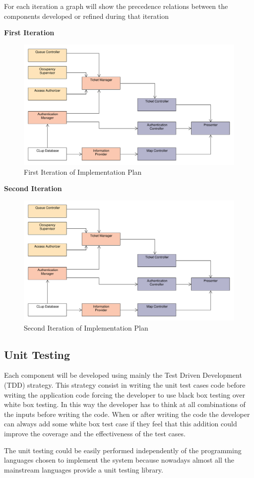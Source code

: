 For each iteration a graph will show the precedence relations between the components developed or refined during that iteration

\textbf{First Iteration}

\medskip

\begin{figure}[H]
    \includegraphics[width=\textwidth]{Images/Impl_Plan_1.pdf}
    \caption{\label{fig:UML_virtual_ticket_sequence}First Iteration of Implementation Plan}
\end{figure}

\textbf{Second Iteration}

\medskip

\begin{figure}[H]
    \includegraphics[width=\textwidth]{Images/Impl_Plan_2.pdf}
    \caption{\label{fig:UML_virtual_ticket_sequence}Second Iteration of Implementation Plan}
\end{figure}


\subsection{Unit Testing}
Each component will be developed using mainly the Test Driven Development (TDD) strategy. This strategy consist in writing the unit test cases code before writing the application code forcing the developer to use black box testing over white box testing. In this way the developer has to think at all combinations of the inputs before writing the code. When or after writing the code the developer can always add some white box test case if they feel that this addition could improve the coverage and the effectiveness of the test cases.

The unit testing could be easily performed independently of the programming languages chosen to implement the system because nowadays almost all the mainstream languages provide a unit testing library.
